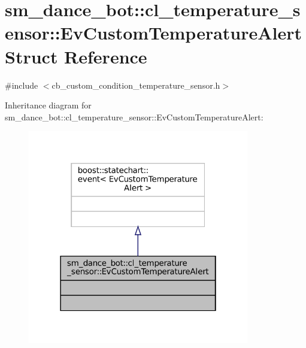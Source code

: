\hypertarget{structsm__dance__bot_1_1cl__temperature__sensor_1_1EvCustomTemperatureAlert}{}\section{sm\+\_\+dance\+\_\+bot\+:\+:cl\+\_\+temperature\+\_\+sensor\+:\+:Ev\+Custom\+Temperature\+Alert Struct Reference}
\label{structsm__dance__bot_1_1cl__temperature__sensor_1_1EvCustomTemperatureAlert}


{\ttfamily \#include $<$cb\+\_\+custom\+\_\+condition\+\_\+temperature\+\_\+sensor.\+h$>$}



Inheritance diagram for sm\+\_\+dance\+\_\+bot\+:\+:cl\+\_\+temperature\+\_\+sensor\+:\+:Ev\+Custom\+Temperature\+Alert\+:
\nopagebreak
\begin{figure}[H]
\begin{center}
\leavevmode
\includegraphics[width=274pt]{structsm__dance__bot_1_1cl__temperature__sensor_1_1EvCustomTemperatureAlert__inherit__graph}
\end{center}
\end{figure}


